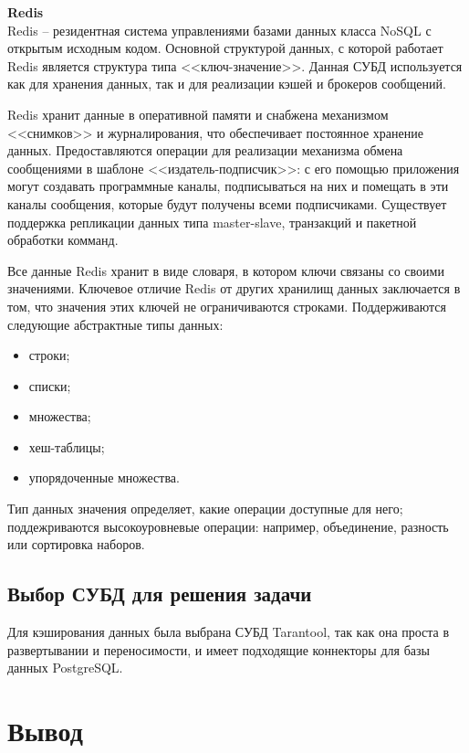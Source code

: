 \noindent\textbf{Redis}\\

Redis \cite{redis} -- резидентная система управлениями базами данных класса NoSQL с открытым исходным кодом. Основной структурой данных, с которой работает Redis является структура типа <<ключ-значение>>. Данная СУБД используется как для хранения данных, так и для реализации кэшей и брокеров сообщений.

Redis хранит данные в оперативной памяти и снабжена механизмом <<снимков>> и журналирования, что обеспечивает постоянное хранение данных. Предоставляются операции для реализации механизма обмена сообщениями в шаблоне <<издатель-подписчик>>: с его помощью приложения могут создавать программные каналы, подписываться на них и помещать в эти каналы сообщения, которые будут получены всеми подписчиками. Существует поддержка репликации данных типа master-slave, транзакций и пакетной обработки комманд.

Все данные Redis хранит в виде словаря, в котором ключи связаны со своими значениями. Ключевое отличие Redis от других хранилищ данных заключается в том, что значения этих ключей не ограничиваются строками. Поддерживаются следующие абстрактные типы данных:

\begin{itemize}
	\item строки;
	\item списки;
	\item множества;
	\item хеш-таблицы;
	\item упорядоченные множества.
\end{itemize}

Тип данных значения определяет, какие операции доступные для него; поддежриваются высокоуровневые операции: например, объединение, разность или сортировка наборов.

\subsection{Выбор СУБД для решения задачи}

Для кэширования данных была выбрана СУБД Tarantool, так как она проста в развертывании и переносимости, и имеет подходящие коннекторы для базы данных PostgreSQL.


\section*{Вывод}

